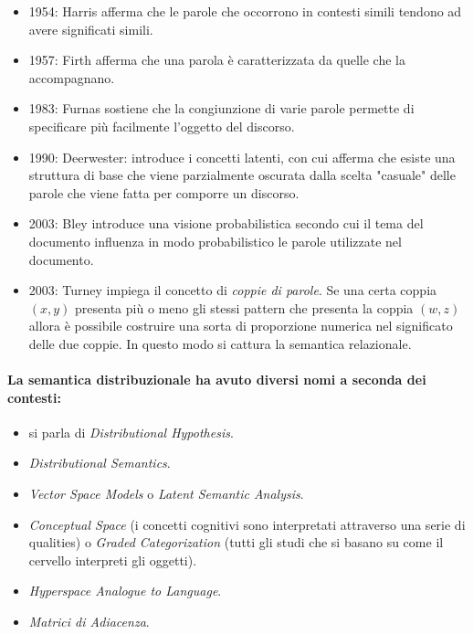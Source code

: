 \begin{itemize}
  \item 1954: Harris afferma che le parole che occorrono in contesti simili tendono ad avere significati simili. 
  \item 1957: Firth afferma che una parola è caratterizzata da quelle che la accompagnano. 
  \item 1983: Furnas sostiene che la congiunzione di varie parole permette di specificare più facilmente l'oggetto del discorso. 
  \item 1990: Deerwester: introduce i concetti latenti, con cui afferma che esiste una struttura di base che viene parzialmente oscurata dalla scelta "casuale" delle parole che viene fatta per comporre un discorso. 
  \item 2003: Bley introduce una visione probabilistica secondo cui il tema del documento influenza in modo probabilistico le parole utilizzate nel documento.
  \item 2003: Turney impiega il concetto di \textit{coppie di parole}. Se una certa coppia $(x, y)$ presenta più o meno gli stessi pattern che presenta la coppia $(w, z)$ allora è possibile costruire una sorta di proporzione numerica nel significato delle due coppie. In questo modo si cattura la semantica relazionale.
\end{itemize}

\paragraph{La semantica distribuzionale ha avuto diversi nomi a seconda dei contesti:}

\begin{itemize}
  \item {} si parla di \textit{Distributional Hypothesis}. 
  \item {} \textit{Distributional Semantics}. 
  \item {} \textit{Vector Space Models} o \textit{Latent Semantic Analysis}. 
  \item {} \textit{Conceptual Space} (i concetti cognitivi sono interpretati attraverso una serie di qualities) o \textit{Graded Categorization} (tutti gli studi che si basano su come il cervello interpreti gli oggetti).
  \item {} \textit{Hyperspace Analogue to Language}. 
  \item {} \textit{Matrici di Adiacenza}.
\end{itemize}

